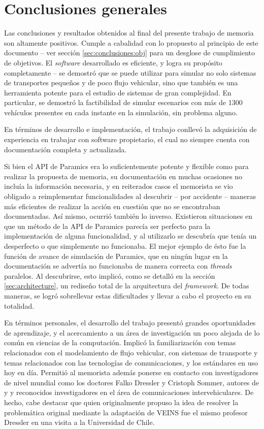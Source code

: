 \section{Conclusiones generales}

Las conclusiones y resultados obtenidos al final del presente trabajo de memoria son altamente positivos. Cumple a cabalidad con lo propuesto al principio de este documento -- ver sección \ref{sec:conclusiones:obj} para un desglose de cumplimiento de objetivos. El \emph{software} desarrollado es eficiente, y logra su propósito completamente -- se demostró que se puede utilizar para simular no solo sistemas de transportes pequeños y de poco flujo vehicular, sino que también es una herramienta potente para el estudio de sistemas de gran complejidad. En particular, se demostró la factibilidad de simular escenarios con más de 1300 vehículos presentes en cada instante en la simulación, sin problema alguno. 

En términos de desarrollo e implementación, el trabajo conllevó la adquisición de experiencia en trabajar con software propietario, el cual no siempre cuenta con documentación completa y actualizada. 

Si bien el API de Paramics era lo suficientemente potente y flexible como para realizar la propuesta de memoria, su documentación en muchas ocasiones no incluía la información necesaria, y en reiterados casos el memorista se vio obligado a reimplementar funcionalidades al descubrir -- por accidente -- maneras más eficientes de realizar la acción en cuestión que no se encontraban documentadas. 
Así mismo, ocurrió también lo inverso. Existieron situaciones en que un método de la API de Paramics parecía ser perfecto para la implementación de alguna funcionalidad, y al utilizarlo se descubría que tenía un desperfecto o que simplemente no funcionaba. El mejor ejemplo de ésto fue la función de avance de simulación de Paramics, que en ningún lugar en la documentación se advertía no funcionaba de manera correcta con \emph{threads} paralelos. Al descubrirse, esto implicó, como se detalló en la sección \ref{sec:architecture}, un rediseño total de la arquitectura del \emph{framework}. De todas maneras, se logró sobrellevar estas dificultades y llevar a cabo el proyecto en su totalidad.

En términos personales, el desarrollo del trabajo presentó grandes oportunidades de aprendizaje, y el acercamiento a un área de investigación un poco alejada de lo común en ciencias de la computación. Implicó la familiarización con temas relacionados con el modelamiento de flujo vehicular, con sistemas de transporte y temas relacionados con las tecnologías de comunicaciones, y los estándares en uso hoy en día. Permitió al memorista además ponerse en contacto con investigadores de nivel mundial como los doctores Falko Dressler y Cristoph Sommer, autores de \autocite{sommer_german_dressler} y \autocite{sommer_dressler2} y reconocidos investigadores en el área de comunicaciones intervehiculares. De hecho, cabe destacar que quien originalmente propuso la idea de resolver la problemática original mediante la adaptación de VEINS fue el mismo profesor Dressler en una visita a la Universidad de Chile.

